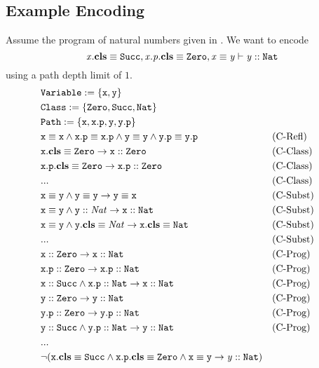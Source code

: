 \documentclass[a4paper]{article}
\begin{document}
\subsection{Example Encoding}
Assume the program of natural numbers given in .
We want to encode
\[ \mathit{x}.\textbf{cls} \equiv \mathit{\mathtt{Succ}}, \mathit{x.p}.\textbf{cls} \equiv \mathit{\mathtt{Zero}}, \mathit{x} \equiv \mathit{y} \vdash \mathit{y} :: \mathit{\mathtt{Nat}} \]
using a path depth limit of $1$.
\setcounter{equation}{0}
\begin{align}
  &\texttt{\ensuremath{\mathtt{Variable}}} := \{\mathtt{x}, \mathtt{y}\}\\
  &\texttt{\ensuremath{\mathtt{Class}}} := \{\mathtt{Zero},\mathtt{Succ},\mathtt{Nat}\}\\
  &\texttt{\ensuremath{\mathtt{Path}}} := \{\mathtt{x}, \mathtt{x.p}, \mathtt{y}, \mathtt{y.p}\}\\
  &\mathit{\mathtt{x}} \equiv \mathit{\mathtt{x}} \land
  \mathit{\mathtt{x.p}} \equiv \mathit{\mathtt{x.p}} \land
  \mathit{\mathtt{y}} \equiv \mathit{\mathtt{y}} \land
  \mathit{\mathtt{y.p}} \equiv \mathit{\mathtt{y.p}} && \text{(C-Refl)}\\
  &\mathit{\mathtt{x}}.\textbf{cls} \equiv \mathit{\mathtt{Zero}} \rightarrow \mathit{\mathtt{x}} :: \mathit{\mathtt{Zero}} && \text{(C-Class)}\\
  &\mathit{\mathtt{x.p}}.\textbf{cls} \equiv \mathit{\mathtt{Zero}} \rightarrow \mathit{\mathtt{x.p}} :: \mathit{\mathtt{Zero}} && \text{(C-Class)}\\
  & ...  && \text{(C-Class)}\\
  & \mathit{\mathtt{x}} \equiv \mathit{\mathtt{y}} \land \mathit{\mathtt{y}} \equiv \mathit{\mathtt{y}} \rightarrow \mathit{\mathtt{y}} \equiv \mathit{\mathtt{x}} && \text{(C-Subst)}\\
  & \mathit{\mathtt{x}} \equiv \mathit{\mathtt{y}} \land \mathit{\mathtt{y}} :: \mathit{Nat} \rightarrow \mathit{\mathtt{x}} :: \mathit{\mathtt{Nat}} && \text{(C-Subst)}\\
  & \mathit{\mathtt{x}} \equiv \mathit{\mathtt{y}} \land \mathit{\mathtt{y}}.\textbf{cls} \equiv \mathit{Nat} \rightarrow \mathit{\mathtt{x}}.\textbf{cls} \equiv \mathit{\mathtt{Nat}} && \text{(C-Subst)}\\
  & ... && \text{(C-Subst)}\\
  &\mathit{\mathtt{x}} :: \mathit{\mathtt{Zero}} \rightarrow \mathit{\mathtt{x}} :: \mathit{\mathtt{Nat}} && \text{(C-Prog)}\\
  &\mathit{\mathtt{x.p}} :: \mathit{\mathtt{Zero}} \rightarrow \mathit{\mathtt{x.p}} :: \mathit{\mathtt{Nat}} && \text{(C-Prog)}\\
  &\mathit{\mathtt{x}} :: \mathit{\mathtt{Succ}} \land \mathit{\mathtt{x.p}} :: \mathit{\mathtt{Nat}} \rightarrow \mathit{\mathtt{x}} :: \mathit{\mathtt{Nat}} && \text{(C-Prog)}\\
  &\mathit{\mathtt{y}} :: \mathit{\mathtt{Zero}} \rightarrow \mathit{\mathtt{y}} :: \mathit{\mathtt{Nat}} && \text{(C-Prog)}\\
  &\mathit{\mathtt{y.p}} :: \mathit{\mathtt{Zero}} \rightarrow \mathit{\mathtt{y.p}} :: \mathit{\mathtt{Nat}} && \text{(C-Prog)}\\
  &\mathit{\mathtt{y}} :: \mathit{\mathtt{Succ}} \land \mathit{\mathtt{y.p}} :: \mathit{\mathtt{Nat}} \rightarrow \mathit{\mathtt{y}} :: \mathit{\mathtt{Nat}} && \text{(C-Prog)}\\
  &...\\
  &\neg (\mathit{\mathtt{x}}.\textbf{cls} \equiv \mathit{\mathtt{Succ}} \land
        \mathit{\mathtt{x.p}}.\textbf{cls} \equiv \mathit{\mathtt{Zero}} \land
        \mathit{\mathtt{x}} \equiv \mathit{\mathtt{y}} \rightarrow
          \mathit{y} :: \mathit{\mathtt{Nat}})
\end{align}
\end{document}

